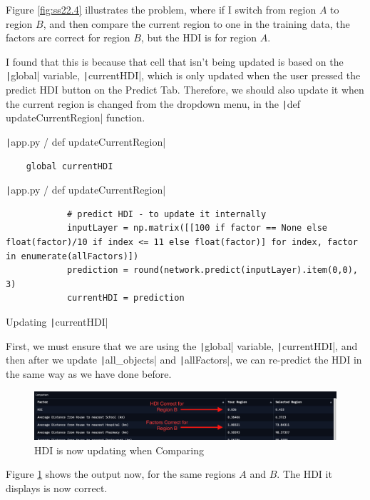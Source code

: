 \documentclass[12pt]{report}
\newcommand{\pil}[1]{\protect\texttt|#1|}
\begin{document}
Figure \ref{fig:ss22.4} illustrates the problem, where if I switch from region $A$ to region $B$, and then compare the current region to one in the training data, the factors are correct for region $B$, but the HDI is for region $A$.

I found that this is because that cell that isn't being updated is based on the \pil{global} variable, \pil{currentHDI}, which is only updated when the user pressed the predict HDI button on the Predict Tab. Therefore, we should also update it when the current region is changed from the dropdown menu, in the \pil{def updateCurrentRegion} function.

\begin{listing}[H]
\pil{app.py / def updateCurrentRegion}
\begin{verbatim}
    global currentHDI
\end{verbatim}
\pil{app.py / def updateCurrentRegion}
\begin{verbatim}
            # predict HDI - to update it internally
            inputLayer = np.matrix([[100 if factor == None else float(factor)/10 if index <= 11 else float(factor)] for index, factor in enumerate(allFactors)])
            prediction = round(network.predict(inputLayer).item(0,0), 3)
            currentHDI = prediction
\end{verbatim}
\caption{Updating \pil{currentHDI}}\label{cs:updateCurrentHDI}
\end{listing}

First, we must ensure that we are using the \pil{global} variable, \pil{currentHDI}, and then after we update \pil{all_objects} and \pil{allFactors}, we can re-predict the HDI in the same way as we have done before.

\begin{figure}[H]
\centering
\includegraphics[width=14cm]{ss22.5.png}
\caption{HDI is now updating when Comparing}\label{fig:ss22.5}
\end{figure}

Figure \ref{fig:ss22.5} shows the output now, for the same regions $A$ and $B$. The HDI it displays is now correct.
\end{document}
